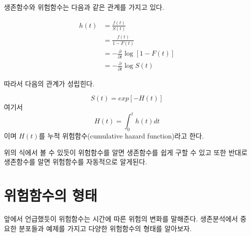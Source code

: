 \documentclass[
]{book}
\theoremstyle{definition}
\theoremstyle{definition}
\theoremstyle{definition}
\theoremstyle{definition}
\theoremstyle{remark}
\begin{document}
생존함수와 위험함수는 다음과 같은 관계를 가지고 있다.

\begin{align*}
h(t) & = \frac{f(t)}{S(t)} \\
  & = \frac{f(t)}{1-F(t)} \\
  & = - \frac {\partial}{\partial t} \log [1-F(t)] \\
  & = - \frac {\partial}{\partial t} \log S(t)
\end{align*}

따라서 다음의 관계가 성립힌다.

\[ S(t) = exp[-H(t)] \]
여기서
\[ H(t) = \int_0^t h(t) dt \]
이며 \(H(t)\)를 누적 위험함수(cumulative hazard function)라고 한다.

위의 식에서 볼 수 있듯이 위험함수를 알면 생존함수를 쉽게 구할 수 있고 또한 반대로 생존함수를 알면 위험함수를 자동적으로 알게된다.

\hypertarget{uxc704uxd5d8uxd568uxc218uxc758-uxd615uxd0dc}{%
\section{위험함수의 형태}\label{uxc704uxd5d8uxd568uxc218uxc758-uxd615uxd0dc}}

앞에서 언급했듯이 위험함수는 시간에 따른 위험의 변화를 말해준다. 생존분석에서 중요한 분포들과 예제를 가지고 다양한 위험함수의 형태를 알아보자.
\end{document}
